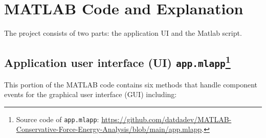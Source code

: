 \documentclass[13pt,a4paper]{report}
\begin{document}
\newpage
\section{MATLAB Code and Explanation}

The project consists of two parts: the application UI and the Matlab script.

\subsection[Application user interface (UI) \texttt{app.mlapp}]{Application user interface (UI) \texttt{app.mlapp}\protect\footnote[1]{Source code of \texttt{app.mlapp}: \url{https://github.com/datdadev/MATLAB-Conservative-Force-Energy-Analysis/blob/main/app.mlapp}.}}

This portion of the MATLAB code contains six methods that handle component events for the graphical user interface (GUI) including:
\end{document}
